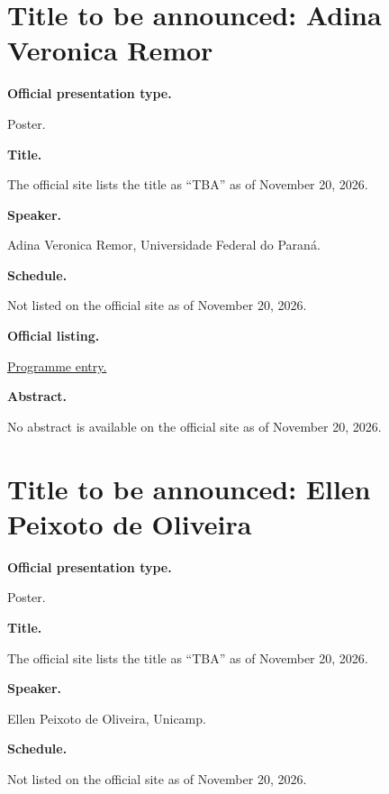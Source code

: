 \section{Title to be announced: Adina
Veronica Remor}
\label{section-tba-poster-remor}

\medskip\noindent
{\bf Official presentation type.}

Poster.

\medskip\noindent
{\bf Title.}

The official site lists the title as
``TBA'' as of November 20, 2026.

\medskip\noindent
{\bf Speaker.}

Adina Veronica Remor, Universidade Federal do
Paraná.

\medskip\noindent
{\bf Schedule.}

Not listed on the official site as of
November 20, 2026.

\medskip\noindent
{\bf Official listing.}

\href{%
https://sites.google.com/view/%
geoalgcompluff/legal/%
legal-2027-resumos#h.f3btoqn8ykd7%
}{Programme entry.}

\medskip\noindent
{\bf Abstract.}

No abstract is available on the
official site as of November 20, 2026.

\section{Title to be announced: Ellen Peixoto
de Oliveira}
\label{section-tba-poster-oliveira}

\medskip\noindent
{\bf Official presentation type.}

Poster.

\medskip\noindent
{\bf Title.}

The official site lists the title as
``TBA'' as of November 20, 2026.

\medskip\noindent
{\bf Speaker.}

Ellen Peixoto de Oliveira, Unicamp.

\medskip\noindent
{\bf Schedule.}

Not listed on the official site as of
November 20, 2026.

